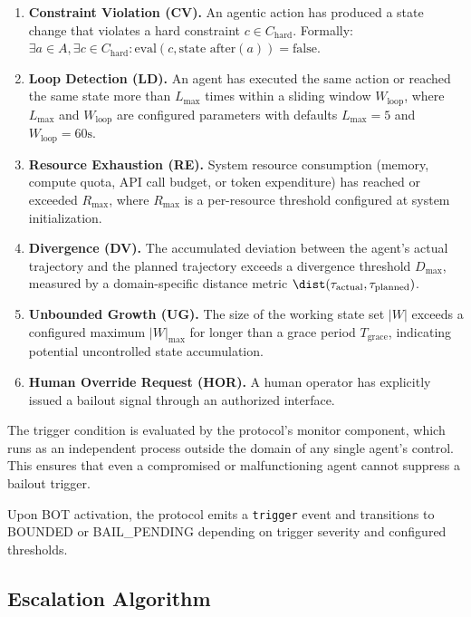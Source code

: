 \begin{enumerate}
    \item \textbf{Constraint Violation (CV).} An agentic action has produced a state change that violates a hard constraint $c \in C_{\text{hard}}$. Formally: $\exists a \in A, \exists c \in C_{\text{hard}}: \text{eval}(c, \text{state after}(a)) = \text{false}$.
    
    \item \textbf{Loop Detection (LD).} An agent has executed the same action or reached the same state more than $L_{\max}$ times within a sliding window $W_{\text{loop}}$, where $L_{\max}$ and $W_{\text{loop}}$ are configured parameters with defaults $L_{\max} = 5$ and $W_{\text{loop}} = 60\text{s}$.
    
    \item \textbf{Resource Exhaustion (RE).} System resource consumption (memory, compute quota, API call budget, or token expenditure) has reached or exceeded $R_{\max}$, where $R_{\max}$ is a per-resource threshold configured at system initialization.
    
    \item \textbf{Divergence (DV).} The accumulated deviation between the agent's actual trajectory and the planned trajectory exceeds a divergence threshold $D_{\max}$, measured by a domain-specific distance metric $\dist(\tau_{\text{actual}}, \tau_{\text{planned}})$.
    
    \item \textbf{Unbounded Growth (UG).} The size of the working state set $|W|$ exceeds a configured maximum $|W|_{\max}$ for longer than a grace period $T_{\text{grace}}$, indicating potential uncontrolled state accumulation.
    
    \item \textbf{Human Override Request (HOR).} A human operator has explicitly issued a bailout signal through an authorized interface.
\end{enumerate}

The trigger condition is evaluated by the protocol's monitor component, which runs as an independent process outside the domain of any single agent's control. This ensures that even a compromised or malfunctioning agent cannot suppress a bailout trigger.

Upon BOT activation, the protocol emits a \texttt{trigger} event and transitions to BOUNDED or BAIL\_PENDING depending on trigger severity and configured thresholds.

\subsection{Escalation Algorithm}

